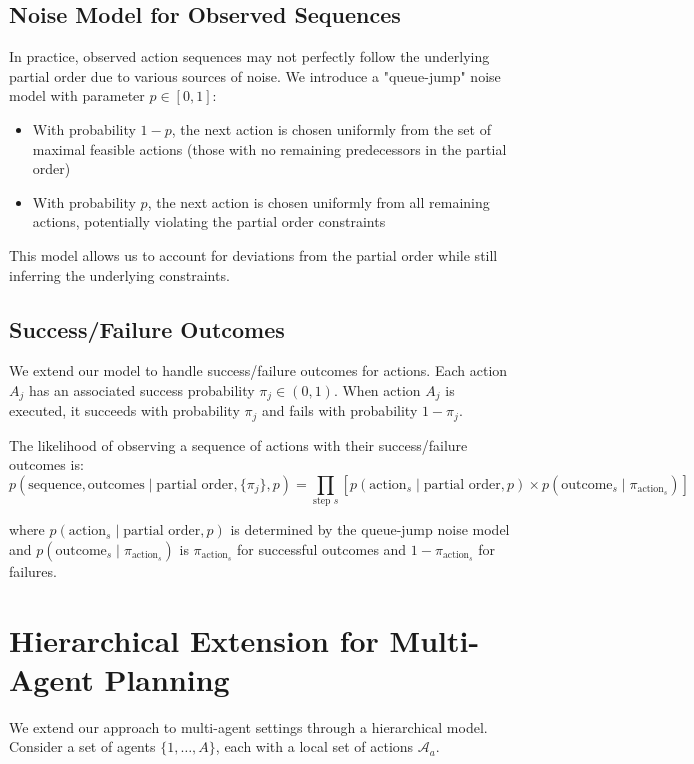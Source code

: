 \documentclass[twocolumn, 10pt]{article}
\begin{document}
\subsection{Noise Model for Observed Sequences}
In practice, observed action sequences may not perfectly follow the underlying partial order due to various sources of noise. We introduce a "queue-jump" noise model with parameter $p \in [0, 1]$:

\begin{itemize}
    \item With probability $1-p$, the next action is chosen uniformly from the set of maximal feasible actions (those with no remaining predecessors in the partial order)
    \item With probability $p$, the next action is chosen uniformly from all remaining actions, potentially violating the partial order constraints
\end{itemize}

This model allows us to account for deviations from the partial order while still inferring the underlying constraints.

\subsection{Success/Failure Outcomes}
We extend our model to handle success/failure outcomes for actions. Each action $A_j$ has an associated success probability $\pi_j \in (0, 1)$. When action $A_j$ is executed, it succeeds with probability $\pi_j$ and fails with probability $1-\pi_j$.

The likelihood of observing a sequence of actions with their success/failure outcomes is:
\begin{equation}
p(\text{sequence}, \text{outcomes} \mid \text{partial order}, \{\pi_j\}, p) = \prod_{\text{step } s} \left[ p(\text{action}_s \mid \text{partial order}, p) \times p(\text{outcome}_s \mid \pi_{\text{action}_s}) \right]
\end{equation}

where $p(\text{action}_s \mid \text{partial order}, p)$ is determined by the queue-jump noise model and $p(\text{outcome}_s \mid \pi_{\text{action}_s})$ is $\pi_{\text{action}_s}$ for successful outcomes and $1-\pi_{\text{action}_s}$ for failures.

\section{Hierarchical Extension for Multi-Agent Planning}
We extend our approach to multi-agent settings through a hierarchical model. Consider a set of agents $\{1, \ldots, A\}$, each with a local set of actions $\mathcal{A}_a$.
\end{document}
